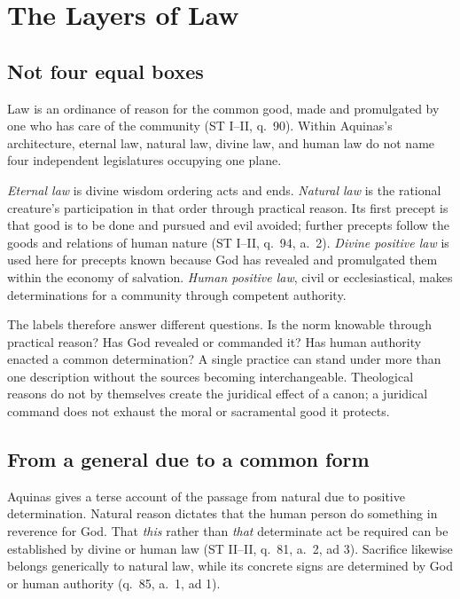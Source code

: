 \section{The Layers of Law}

\subsection{Not four equal boxes}

Law is an ordinance of reason for the common good, made and promulgated by one who has care of the community (ST I--II, q.~90). Within Aquinas's architecture, eternal law, natural law, divine law, and human law do not name four independent legislatures occupying one plane.

\emph{Eternal law} is divine wisdom ordering acts and ends. \emph{Natural law} is the rational creature's participation in that order through practical reason. Its first precept is that good is to be done and pursued and evil avoided; further precepts follow the goods and relations of human nature (ST I--II, q.~94, a.~2). \emph{Divine positive law} is used here for precepts known because God has revealed and promulgated them within the economy of salvation. \emph{Human positive law}, civil or ecclesiastical, makes determinations for a community through competent authority.

The labels therefore answer different questions. Is the norm knowable through practical reason? Has God revealed or commanded it? Has human authority enacted a common determination? A single practice can stand under more than one description without the sources becoming interchangeable. Theological reasons do not by themselves create the juridical effect of a canon; a juridical command does not exhaust the moral or sacramental good it protects.

\subsection{From a general due to a common form}

Aquinas gives a terse account of the passage from natural due to positive determination. Natural reason dictates that the human person do something in reverence for God. That \emph{this} rather than \emph{that} determinate act be required can be established by divine or human law (ST II--II, q.~81, a.~2, ad 3). Sacrifice likewise belongs generically to natural law, while its concrete signs are determined by God or human authority (q.~85, a.~1, ad 1).

